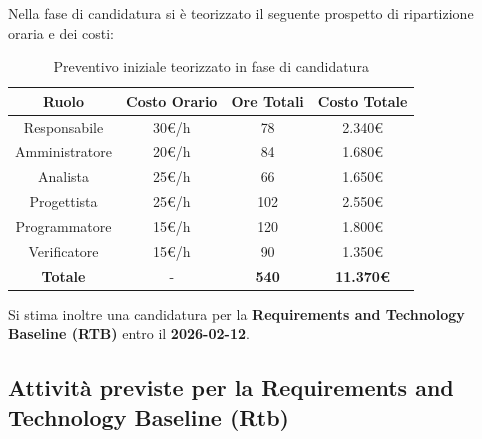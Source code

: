 \documentclass[a4paper,12pt]{article}
\begin{document}
Nella fase di candidatura si è teorizzato il seguente prospetto di ripartizione oraria e dei costi:

\begin{table}[H]
    \centering
    \renewcommand{\arraystretch}{1.5}
    \begin{tabularx}{\textwidth}{|c|C|C|C|}
        \hline
        \textbf{Ruolo} & \textbf{Costo Orario} & \textbf{Ore Totali} & \textbf{Costo Totale} \\
        \hline
        Responsabile & 30€/h & 78 & 2.340\euro \\
        \hline
        Amministratore & 20€/h & 84 & 1.680\euro \\
        \hline
        Analista & 25€/h & 66 & 1.650\euro \\
        \hline
        Progettista & 25€/h & 102 & 2.550\euro \\
        \hline
        Programmatore & 15€/h & 120 & 1.800\euro \\
        \hline
        Verificatore & 15€/h & 90 & 1.350\euro \\
        \hline
        \textbf{Totale} & - & \textbf{540} & \textbf{ 11.370\euro } \\
        \hline
    \end{tabularx}
    \caption{Preventivo iniziale teorizzato in fase di candidatura}
    \label{tab:preventivo_candidatura}
\end{table}

Si stima inoltre una candidatura per la \textbf{Requirements and Technology Baseline (RTB)} entro il \textbf{2026-02-12}.

\subsection{Attività previste per la Requirements and Technology Baseline (Rtb)} \label{subsec:attivita_previste_rtb}
\end{document}
